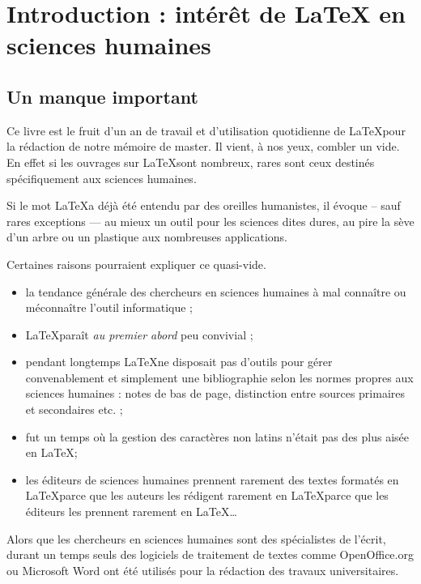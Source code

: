 \chapter[Introduction]{Introduction : intérêt de \LaTeX{} en sciences humaines}

\section{Un manque important}

Ce livre est le fruit d'un an de travail et d'utilisation quotidienne de \LaTeX pour la rédaction de notre mémoire de master. Il vient, à nos yeux,  combler un vide. En effet si les ouvrages sur \LaTeX sont nombreux, rares sont ceux destinés  spécifiquement aux sciences humaines. 

Si le mot \LaTeX a déjà été entendu par des oreilles humanistes, il évoque -- sauf rares exceptions --- au mieux un outil pour les sciences dites dures, au pire la sève d'un arbre ou un plastique aux nombreuses applications. 

Certaines raisons pourraient expliquer ce quasi-vide.
\begin{itemize}
\item la tendance générale des chercheurs en sciences humaines à mal connaître ou méconnaître l'outil informatique ;
\item \LaTeX paraît \emph{au premier abord} peu convivial ;
\item pendant longtemps \LaTeX ne disposait pas d'outils pour gérer convenablement et simplement une bibliographie selon les normes propres aux sciences humaines : notes de bas de page, distinction entre sources primaires et secondaires etc. ;
\item fut un temps où la gestion des caractères non latins n'était pas des plus aisée en \LaTeX ;
\item les éditeurs de sciences humaines prennent rarement des textes formatés en \LaTeX parce que les auteurs les rédigent rarement en \LaTeX parce que les éditeurs les prennent rarement en \LaTeX \ldots
\end{itemize}

Alors que les chercheurs en sciences humaines sont des spécialistes de l'écrit, durant un temps seuls des logiciels de traitement de textes comme OpenOffice.org ou Microsoft Word ont été utilisés pour la rédaction des travaux universitaires.

